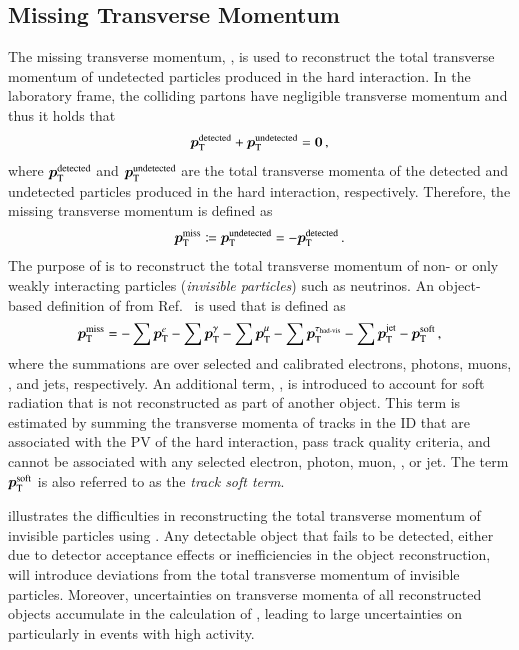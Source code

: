 \subsection{Missing Transverse Momentum}%
\label{sec:atlas_met}

The missing transverse momentum, \pTmiss, is used to reconstruct the total
transverse momentum of undetected particles produced in the hard interaction. In
the laboratory frame, the colliding partons have negligible transverse momentum
and thus it holds that
\begin{align*}
  \bm{p}_{\text{T}}^{\text{detected}} + \bm{p}_{\text{T}}^{\text{undetected}} = \bm{0} \,\text{,}
\end{align*}
where $\bm{p}_{\text{T}}^{\text{detected}}$ and
$\bm{p}_{\text{T}}^{\text{undetected}}$ are the total transverse momenta of
the detected and undetected particles produced in the hard interaction,
respectively. Therefore, the missing transverse momentum is defined as
\begin{align*}
  \bm{p}_{\text{T}}^{\text{miss}}
  \coloneqq \bm{p}_{\text{T}}^{\text{undetected}}
  = -\bm{p}_{\text{T}}^{\text{detected}} \,\text{.}
\end{align*}
The purpose of \pTmiss is to reconstruct the total transverse momentum of non-
or only weakly interacting particles (\emph{invisible particles}) such as
neutrinos. An object-based definition of \pTmiss from Ref.~\cite{PERF-2016-07}
is used that is defined as
\begin{align}
  \bm{p}_{\text{T}}^{\text{miss}} =
  - \sum \bm{p}_{\text{T}}^{e}
  - \sum \bm{p}_{\text{T}}^{\gamma}
  - \sum \bm{p}_{\text{T}}^{\mu}
  - \sum \bm{p}_{\text{T}}^{\tau_{\text{had-vis}}}
  - \sum \bm{p}_{\text{T}}^{\text{jet}}
  - \bm{p}_{\text{T}}^{\text{soft}}
  \,\text{,}
  \label{eq:met}
\end{align}
where the summations are over selected and calibrated electrons, photons, muons,
\tauhadvis, and jets, respectively. An additional term, , is
introduced to account for soft radiation that is not reconstructed as part of
another object. This term is estimated by summing the transverse momenta of
tracks in the ID that are associated with the PV of the hard interaction, pass
track quality criteria, and cannot be associated with any selected electron,
photon, muon, \tauhadvis, or jet. The term $\bm{p}_{\text{T}}^{\text{soft}}$ is also
referred to as the \emph{track soft term}.

 illustrates the difficulties in reconstructing the total
transverse momentum of invisible particles using \pTmiss. Any detectable object
that fails to be detected, either due to detector acceptance effects or
inefficiencies in the object reconstruction, will introduce deviations from the
total transverse momentum of invisible particles. Moreover, uncertainties on
transverse momenta of all reconstructed objects accumulate in the calculation of
\pTmiss, leading to large uncertainties on \pTmiss particularly in events with
high activity.

